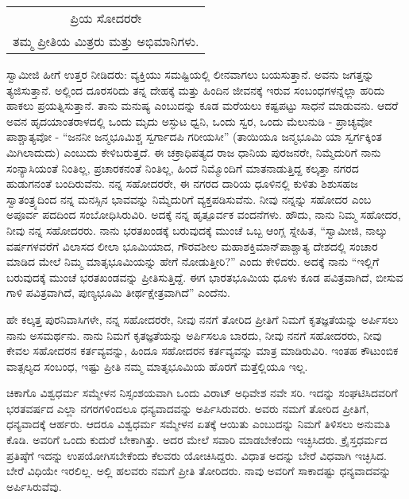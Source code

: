 \begin{longtable}[r]{@{}c@{}}
ಪ್ರಿಯ ಸೋದರರೇ \\
ತಮ್ಮ ಪ್ರೀತಿಯ ಮಿತ್ರರು ಮತ್ತು ಅಭಿಮಾನಿಗಳು. \\
\end{longtable}

ಸ್ವಾಮೀಜಿ ಹೀಗೆ ಉತ್ತರ ನೀಡಿದರು: ವ್ಯಕ್ತಿಯು ಸಮಷ್ಟಿಯಲ್ಲಿ ಲೀನವಾಗಲು ಬಯಸುತ್ತಾನೆ. ಅವನು ಜಗತ್ತನ್ನು ತ್ಯಜಿಸುತ್ತಾನೆ. ಅಲ್ಲಿಂದ ದೂರಸರಿದು ತನ್ನ ದೇಹಕ್ಕೆ ಮತ್ತು ಹಿಂದಿನ ಜೀವನಕ್ಕೆ ಇರುವ ಸಂಬಂಧಗಳನ್ನೆಲ್ಲಾ ಹರಿದು ಹಾಕಲು ಪ್ರಯತ್ನಿಸುತ್ತಾನೆ. ತಾನು ಮನುಷ್ಯ ಎಂಬುದನ್ನು ಕೂಡ ಮರೆಯಲು ಕಷ್ಟಪಟ್ಟು ಸಾಧನೆ ಮಾಡುವನು. ಆದರೆ ಅವನ ಹೃದಯಾಂತರಾಳದಲ್ಲಿ ಒಂದು ಮೃದು ಅಸ್ಫುಟ ಧ್ವನಿ, ಒಂದು ಸ್ವರ, ಒಂದು ಮೆಲುನುಡಿ - ಪ್ರಾಚ್ಯವೋ ಪಾಶ್ಚಾತ್ಯವೋ - “ಜನನೀ ಜನ್ಮಭೂಮಿಶ್ಚ ಸ್ವರ್ಗಾದಪಿ ಗರೀಯಸೀ” (ತಾಯಿಯೂ ಜನ್ಮಭೂಮಿ ಯಾ ಸ್ವರ್ಗಕ್ಕಿಂತ ಮಿಗಿಲಾದುದು) ಎಂಬುದು ಕೇಳಿಬರುತ್ತದೆ. ಈ ಚಕ್ರಾಧಿಪತ್ಯದ ರಾಜ ಧಾನಿಯ ಪುರಜನರೇ, ನಿಮ್ಮೆದುರಿಗೆ ನಾನು ಸಂನ್ಯಾಸಿಯಂತೆ ನಿಂತಿಲ್ಲ, ಪ್ರಚಾರಕನಂತೆ ನಿಂತಿಲ್ಲ, ಹಿಂದೆ ನಿಮ್ಮೊಂದಿಗೆ ಮಾತನಾಡುತ್ತಿದ್ದ ಕಲ್ಕತ್ತಾ ನಗರದ ಹುಡುಗನಂತೆ ಬಂದಿರುವೆನು. ನನ್ನ ಸಹೋದರರೇ, ಈ ನಗರದ ದಾರಿಯ ಧೂಳಿನಲ್ಲಿ ಕುಳಿತು ಶಿಶುಸಹಜ ಸ್ವಾತಂತ್ರ್ಯದಿಂದ ನನ್ನ ಮನಸ್ಸಿನ ಭಾವವನ್ನು ನಿಮ್ಮೆದುರಿಗೆ ವ್ಯಕ್ತಪಡಿಸುವೆನು. ನೀವು ನನ್ನನ್ನು ಸಹೋದರ ಎಂಬ ಅಪೂರ್ವ ಪದದಿಂದ ಸಂಬೋಧಿಸಿರುವಿರಿ. ಅದಕ್ಕೆ ನನ್ನ ಹೃತ್ಪೂರ್ವಕ ವಂದನೆಗಳು. ಹೌದು, ನಾನು ನಿಮ್ಮ ಸಹೋದರ, ನೀವು ನನ್ನ ಸಹೋದರರು. ನಾನು ಭರತಖಂಡಕ್ಕೆ ಬರುವುದಕ್ಕೆ ಮುಂಚೆ ಒಬ್ಬ ಆಂಗ್ಲ ಸ್ನೇಹಿತ, “ಸ್ವಾಮೀಜಿ, ನಾಲ್ಕು ವರ್ಷಗಳವರೆಗೆ ವಿಲಾಸದ ಲೀಲಾ ಭೂಮಿಯಾದ, ಗೌರವಶೀಲ ಮಹಾಶಕ್ತಿಮಾನ್​ ಪಾಶ್ಚಾತ್ಯ ದೇಶದಲ್ಲಿ ಸಂಚಾರ ಮಾಡಿದ ಮೇಲೆ ನಿಮ್ಮ ಮಾತೃಭೂಮಿಯನ್ನು ಹೇಗೆ ನೋಡುತ್ತೀರಿ?” ಎಂದು ಕೇಳಿದರು. ಅದಕ್ಕೆ ನಾನು “ಇಲ್ಲಿಗೆ ಬರುವುದಕ್ಕೆ ಮುಂಚೆ ಭರತಖಂಡವನ್ನು ಪ್ರೀತಿಸುತ್ತಿದ್ದೆ. ಈಗ ಭಾರತಭೂಮಿಯ ಧೂಳು ಕೂಡ ಪವಿತ್ರವಾಗಿದೆ, ಬೀಸುವ ಗಾಳಿ ಪವಿತ್ರವಾಗಿದೆ, ಪುಣ್ಯಭೂಮಿ ತೀರ್ಥಕ್ಷೇತ್ರವಾಗಿದೆ” ಎಂದೆನು.

ಹೇ ಕಲ್ಕತ್ತ ಪುರನಿವಾಸಿಗಳೇ, ನನ್ನ ಸಹೋದರರೇ, ನೀವು ನನಗೆ ತೋರಿದ ಪ್ರೀತಿಗೆ ನಿಮಗೆ ಕೃತಜ್ಞತೆಯನ್ನು ಅರ್ಪಿಸಲು ನಾನು ಅಸಮರ್ಥನು. ನಾನು ನಿಮಗೆ ಕೃತಜ್ಞತೆಯನ್ನು ಅರ್ಪಿಸಲೂ ಬಾರದು, ನೀವು ನನಗೆ ಸಹೋದರರು, ನೀವು ಕೇವಲ ಸಹೋದರನ ಕರ್ತವ್ಯವನ್ನು, ಹಿಂದೂ ಸಹೋದರನ ಕರ್ತವ್ಯವನ್ನು ಮಾತ್ರ ಮಾಡಿರುವಿರಿ. ಇಂತಹ ಕೌಟುಂಬಿಕ ವಾತ್ಸಲ್ಯದ ಸಂಬಂಧ, ಇಷ್ಟು ಪ್ರೀತಿ ನಮ್ಮ ಮಾತೃಭೂಮಿಯ ಹೊರಗೆ ಮತ್ತೆಲ್ಲಿಯೂ ಇಲ್ಲ.

ಚಿಕಾಗೊ ವಿಶ್ವಧರ್ಮ ಸಮ್ಮೇಳನ ನಿಸ್ಸಂಶಯವಾಗಿ ಒಂದು ವಿರಾಟ್​ ಅಧಿವೇಶ ನವೇ ಸರಿ. ಇದನ್ನು ಸಂಘಟಿಸಿದವರಿಗೆ ಭರತವರ್ಷದ ಎಲ್ಲಾ ನಗರಗಳಿಂದಲೂ ಧನ್ಯವಾದವನ್ನು ಅರ್ಪಿಸಿರುವರು. ಅವರು ನಮಗೆ ತೋರಿದ ಪ್ರೀತಿಗೆ, ಧನ್ಯವಾದಕ್ಕೆ ಆರ್ಹರು. ಆದರೂ ವಿಶ್ವಧರ್ಮ ಸಮ್ಮೇಳನ ಏತಕ್ಕೆ ಆಯಿತು ಎಂಬುದನ್ನು ನಿಮಗೆ ತಿಳಿಸಲು ಅನುಮತಿ ಕೊಡಿ. ಅವರಿಗೆ ಒಂದು ಕುದುರೆ ಬೇಕಾಗಿತ್ತು. ಅದರ ಮೇಲೆ ಸವಾರಿ ಮಾಡಬೇಕೆಂದು ಇಚ್ಛಿಸಿದರು. ಕ್ರೈಸ್ತಧರ್ಮದ ಪ್ರತಿಷ್ಠೆಗೆ ಇದನ್ನು ಉಪಯೋಗಿಸಬೇಕೆಂದು ಕೆಲವರು ಯೋಚಿಸಿದ್ದರು. ವಿಧಾತ ಅದನ್ನು ಬೇರೆ ವಿಧವಾಗಿ ಇಚ್ಛಿಸಿದ. ಬೇರೆ ವಿಧಿಯೇ ಇರಲಿಲ್ಲ. ಅಲ್ಲಿ ಹಲವರು ನಮಗೆ ಪ್ರೀತಿ ತೋರಿದರು. ನಾವು ಅವರಿಗೆ ಸಾಕಾದಷ್ಟು ಧನ್ಯವಾದವನ್ನು ಅರ್ಪಿಸಿರುವೆವು.

